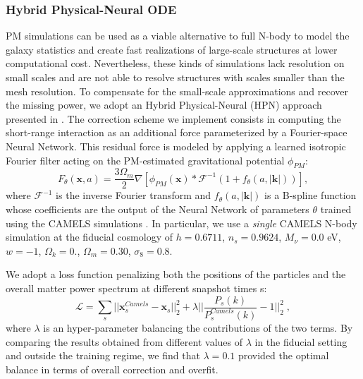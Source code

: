 \documentclass[twocolumn,twocolappendix]{aastex63}
\begin{document}
\subsubsection{ Hybrid Physical-Neural ODE}\label{N_body_des}    
PM simulations can be used as a viable alternative to full N-body to model the galaxy statistics and create fast realizations of large-scale structures at lower computational cost. Nevertheless, these kinds of simulations lack resolution on small scales and are not able to resolve structures with scales smaller than the mesh resolution.
To compensate for
the small-scale approximations and recover the missing power, we adopt an Hybrid Physical-Neural (HPN) approach presented in \citet{lanzieri2022hybrid}. 
The correction scheme we implement consists in computing the short-range interaction as an additional force parameterized by a Fourier-space Neural Network.
This residual force is modeled by applying a learned isotropic Fourier filter acting
on the PM-estimated gravitational potential $\phi_{PM}$:
\begin{equation}\label{hybrid_model}
    F_\theta(\mathbf{x}, a) = \frac{3 \Omega_m}{2}  \nabla \left[ \phi_{PM} (\mathbf{x}) \ast \mathcal{F}^{-1}(1 + f_\theta(a,|\mathbf{k}|)) \right],
\end{equation}
where $\mathcal{F}^{-1}$ is the inverse Fourier transform and $f_\theta(a,|\mathbf{k}|)$ is a B-spline function whose coefficients are the output of the Neural Network of parameters $\theta$ trained using the CAMELS simulations \citep{villaescusa2021camels}. In particular,  we use a \textit{single} CAMELS N-body simulation at the fiducial cosmology of $h=0.6711$, $n_s =0.9624$, $M_{\nu} = 0.0$ eV, $w=-1$, $\Omega_k = 0.$, $\Omega_m=0.30$, $\sigma_8= 0.8$. 


We adopt a loss function penalizing both the positions
of the particles and the overall matter power spectrum at
different snapshot times s:
\begin{equation}\label{loss2}
    \mathcal{L} =  \sum_{s} || \mathbf{x}^{Camels}_s - \mathbf{x}_s ||_2^2  + \lambda || \frac{P_s(k)}{P_s^{Camels}(k)} -1 ||_2^2 \; ,
\end{equation}
where $\lambda$ is an hyper-parameter balancing the
contributions of the two terms. By comparing the results obtained from different values of $\lambda$ in the fiducial setting and outside the training regime, we find that $\lambda= 0.1$ provided the optimal balance in terms of overall correction and overfit. 
\end{document}
